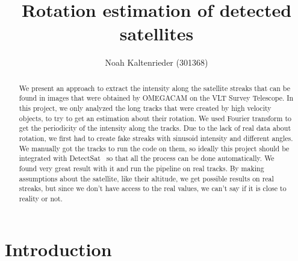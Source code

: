 \documentclass[a4paper,12pt,oneside]{report}
\title{Rotation estimation of detected satellites}
\author{Noah Kaltenrieder (301368)}
\begin{document}
\maketitle
{}
\makeacks

\begin{abstract}
We present an approach to extract the intensity along the satellite streaks that can be found in images that were obtained by OMEGACAM 
on the VLT Survey Telescope. In this project, we only analyzed the long tracks that were created by high velocity objects, to
try to get an estimation about their rotation. We used Fourier transform to get the periodicity of the intensity along the tracks.
Due to the lack of real data about rotation, we first had to create fake streaks with sinusoid intensity and different angles.
We manually got the tracks to run the code on them, so ideally this project should be integrated with DetectSat~\cite{detectsatRepository} so that all 
the process can be done automatically. We found very great result with it and run the pipeline on real tracks. By making assumptions about the satellite, 
like their altitude, we get possible results on real streaks, but since we don't have access to the real values, we can't say if it is close to reality or not.
\end{abstract}


\maketoc

\chapter{Introduction}
\end{document}
